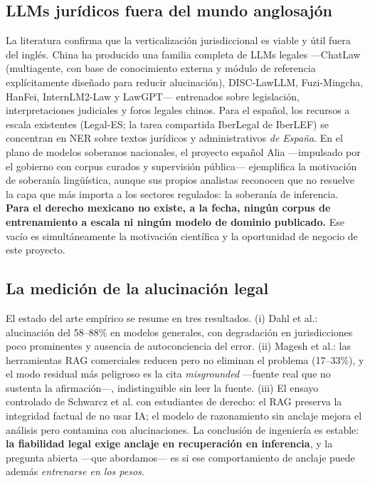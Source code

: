 \subsection{LLMs jurídicos fuera del mundo anglosajón}

La literatura confirma que la verticalización jurisdiccional es viable y útil fuera del inglés. China ha producido una familia completa de LLMs legales ---ChatLaw (multiagente, con base de conocimiento externa y módulo de referencia explícitamente diseñado para reducir alucinación),\cite{cui2024chatlaw} DISC-LawLLM, Fuzi-Mingcha, HanFei, InternLM2-Law y LawGPT--- entrenados sobre legislación, interpretaciones judiciales y foros legales chinos.\cite{surveylegal2025} Para el español, los recursos a escala existentes (Legal-ES; la tarea compartida IberLegal de IberLEF) se concentran en NER sobre textos jurídicos y administrativos \emph{de España}.\cite{legales2020} En el plano de modelos soberanos nacionales, el proyecto español Alia ---impulsado por el gobierno con corpus curados y supervisión pública--- ejemplifica la motivación de soberanía lingüística, aunque sus propios analistas reconocen que no resuelve la capa que más importa a los sectores regulados: la soberanía de inferencia.\cite{alia2026} \textbf{Para el derecho mexicano no existe, a la fecha, ningún corpus de entrenamiento a escala ni ningún modelo de dominio publicado.} Ese vacío es simultáneamente la motivación científica y la oportunidad de negocio de este proyecto.

\subsection{La medición de la alucinación legal}

El estado del arte empírico se resume en tres resultados. (i) Dahl et al.: alucinación del 58--88\% en modelos generales, con degradación en jurisdicciones poco prominentes y ausencia de autoconciencia del error.\cite{dahl2024} (ii) Magesh et al.: las herramientas RAG comerciales reducen pero no eliminan el problema (17--33\%), y el modo residual más peligroso es la cita \emph{misgrounded} ---fuente real que no sustenta la afirmación---, indistinguible sin leer la fuente.\cite{magesh2025} (iii) El ensayo controlado de Schwarcz et al. con estudiantes de derecho: el RAG preserva la integridad factual de no usar IA; el modelo de razonamiento sin anclaje mejora el análisis pero contamina con alucinaciones.\cite{ailawlibrarians2026} La conclusión de ingeniería es estable: \textbf{la fiabilidad legal exige anclaje en recuperación en inferencia}, y la pregunta abierta ---que abordamos--- es si ese comportamiento de anclaje puede además \emph{entrenarse en los pesos}.

